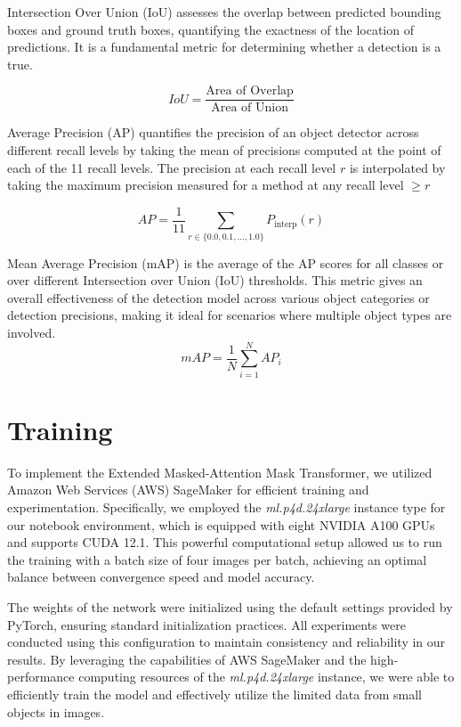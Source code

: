 Intersection Over Union (IoU) \cite{metrics} assesses the overlap between predicted bounding boxes and ground truth boxes, quantifying the exactness of the location 
of predictions. It is a fundamental metric for determining whether a detection is a true.

\begin{equation}
    IoU = \frac{\text{Area of Overlap}}{\text{Area of Union}} \tag{19}
\end{equation}


Average Precision (AP) \cite{metrics}quantifies the precision of an object detector across different recall levels by taking the mean of precisions computed 
at the point of each of the 11 recall levels. The precision at each recall level $r$ is interpolated by taking the maximum precision measured 
for a method at any recall level $\geqslant r$

\begin{equation}
    AP = \frac{1}{11} \sum_{r \in \{0.0, 0.1, \ldots, 1.0\}} P_{\text{interp}}(r) \tag{20}
\end{equation}


Mean Average Precision (mAP) \cite{metrics} is the average of the AP scores for all classes or over different Intersection over Union (IoU) thresholds. 
This metric gives an overall effectiveness of the detection model across various object categories or detection precisions, making it ideal for 
scenarios where multiple object types are involved.
\begin{equation}
    mAP = \frac{1}{N} \sum_{i=1}^{N} AP_i \tag{21}
\end{equation}


\newpage
\section{Training}

To implement the Extended Masked-Attention Mask Transformer, we utilized Amazon Web Services (AWS) SageMaker for efficient training and experimentation. 
Specifically, we employed the \textit{ml.p4d.24xlarge} instance type for our notebook environment, which is equipped with eight NVIDIA A100 GPUs and supports CUDA 12.1. 
This powerful computational setup allowed us to run the training with a batch size of four images per batch, achieving an optimal balance between convergence 
speed and model accuracy.

The weights of the network were initialized using the default settings provided by PyTorch, ensuring standard initialization practices. All experiments were 
conducted using this configuration to maintain consistency and reliability in our results. By leveraging the capabilities of AWS SageMaker and the high-performance 
computing resources of the \textit{ml.p4d.24xlarge} instance, we were able to efficiently train the model and effectively utilize the limited data from small objects in images.

